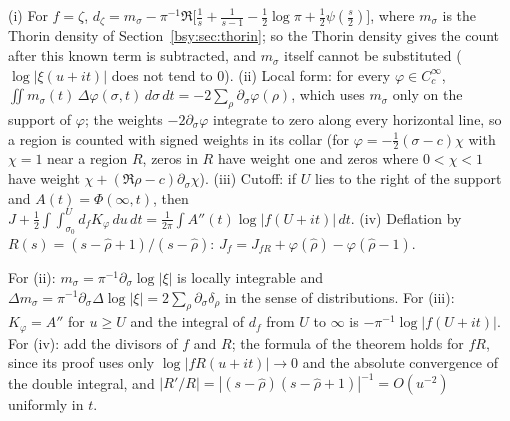 \begin{remark}
(i) For $f=\zeta$, $d_\zeta=m_\sigma-\pi^{-1}\Re\bigl[\frac1s+\frac1{s-1}-\frac12\log\pi+\frac12\psi(\frac s2)\bigr]$, where $m_\sigma$ is the Thorin density of Section~\ref{bsy:sec:thorin}; so the Thorin density gives the count after this known term is subtracted, and $m_\sigma$ itself cannot be substituted ($\log|\xi(u+it)|$ does not tend to $0$). (ii) Local form: for every $\varphi\in C_c^\infty$, $\iint m_\sigma(t)\,\Delta\varphi(\sigma,t)\,d\sigma\,dt=-2\sum_\rho\partial_\sigma\varphi(\rho)$, which uses $m_\sigma$ only on the support of $\varphi$; the weights $-2\partial_\sigma\varphi$ integrate to zero along every horizontal line, so a region is counted with signed weights in its collar (for $\varphi=-\frac12(\sigma-c)\chi$ with $\chi=1$ near a region $R$, zeros in $R$ have weight one and zeros where $0<\chi<1$ have weight $\chi+(\Re\rho-c)\partial_\sigma\chi$). (iii) Cutoff: if $U$ lies to the right of the support and $A(t)=\Phi(\infty,t)$, then $J+\frac12\int\!\int_{\sigma_0}^Ud_fK_\varphi\,du\,dt=\frac1{2\pi}\int A''(t)\log|f(U+it)|\,dt$. (iv) Deflation by $R(s)=(s-\hat\rho+1)/(s-\hat\rho)$: $J_f=J_{fR}+\varphi(\hat\rho)-\varphi(\hat\rho-1)$.

For (ii): $m_\sigma=\pi^{-1}\partial_\sigma\log|\xi|$ is locally integrable and $\Delta m_\sigma=\pi^{-1}\partial_\sigma\Delta\log|\xi|=2\sum_\rho\partial_\sigma\delta_\rho$ in the sense of distributions. For (iii): $K_\varphi=A''$ for $u\ge U$ and the integral of $d_f$ from $U$ to $\infty$ is $-\pi^{-1}\log|f(U+it)|$. For (iv): add the divisors of $f$ and $R$; the formula of the theorem holds for $fR$, since its proof uses only $\log|fR(u+it)|\to0$ and the absolute convergence of the double integral, and $|R'/R|=|(s-\hat\rho)(s-\hat\rho+1)|^{-1}=O(u^{-2})$ uniformly in $t$.
\end{remark}

